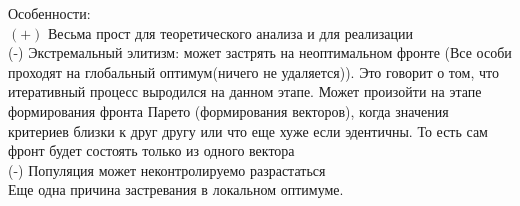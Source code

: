 Особенности:\\
$(+)$ Весьма прост для теоретического анализа и для реализации\\
(-) Экстремальный элитизм: может застрять на неоптимальном фронте (Все особи проходят на глобальный оптимум(ничего не удаляется)). Это говорит о том, что итеративный процесс выродился на данном этапе. Может произойти на этапе формирования фронта Парето (формирования векторов), когда значения критериев близки к друг другу или что еще хуже если эдентичны. То есть сам фронт будет состоять только из одного вектора\\
(-) Популяция может неконтролируемо разрастаться\\
Еще одна причина застревания в локальном оптимуме.

